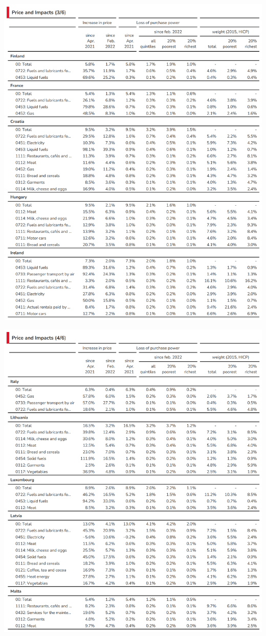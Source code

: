 \documentclass[
  9pt,
  a4paper,
  DIV=11,
  numbers=noendperiod]{scrartcl}
\begin{document}
\includegraphics[width=17cm,height=\textheight]{../svg/annex_3.png}

\includegraphics[width=17cm,height=\textheight]{../svg/annex_4.png}
\end{document}

